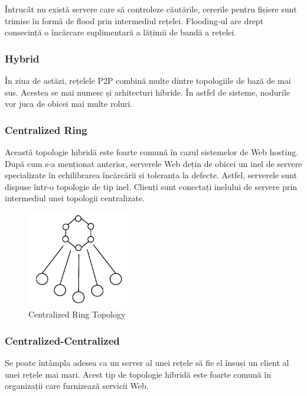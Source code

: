 Întrucât nu există servere care să controleze căutările, cererile pentru
fișiere sunt trimise în formă de flood prin intermediul rețelei. Flooding-ul
are drept consecință o încărcare suplimentară a lățimii de bandă a rețelei.

\subsubsection{Hybrid}

În ziua de astăzi, rețelele P2P combină multe dintre topologiile de bază de
mai sus. Acestea se mai numesc și arhitecturi hibride. În astfel de sisteme,
nodurile vor juca de obicei mai multe roluri.

\subsubsection{Centralized Ring}

Această topologie hibridă este foarte comună în cazul sistemelor de Web
hosting. După cum s-a menționat anterior, serverele Web dețin de obicei un
inel de servere specializate în echilibrarea încărcării și toleranța la
defecte. Astfel, serverele sunt dispuse într-o topologie de tip inel. Clienți
sunt conectați inelului de servere prin intermediul unei topologii
centralizate.

\begin{figure}
  \centering
  \includegraphics[width=0.4\textwidth]{src/img/p2p-systems/centralized-ring}
  \caption{Centralized Ring Topology}
  \label{fig:p2p-systems:centralized-ring}
\end{figure}

\subsubsection{Centralized-Centralized}

Se poate întâmpla adesea ca un server al unei rețele să fie el însuși un
client al unei rețele mai mari. Acest tip de topologie hibridă este foarte
comună în organizații care furnizează servicii Web.

